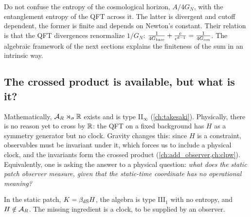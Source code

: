 \begin{whatwrong}
Do not confuse the entropy of the cosmological horizon, $A/4G_N$, with the entanglement entropy of the QFT across it. The latter is divergent and cutoff dependent, the former is finite and depends on Newton's constant. Their relation is that the QFT divergences renormalize $1/G_N$: $\frac{1}{4G_{\rm bare}}+\frac{c}{\epsilon^{d-1}}=\frac{1}{4G_{\rm ren}}$. The algebraic framework of the next sections explains the finiteness of the sum in an intrinsic way.
\end{whatwrong}

\subsection{The crossed product is available, but what is it?}

Mathematically, $\mathcal{A}_R\rtimes_\sigma\mathbb{R}$ exists and is type II$_\infty$ (\cref{ch:takesaki}). Physically, there is no reason yet to cross by $\mathbb{R}$: the QFT on a fixed background has $H$ as a symmetry generator but no clock. Gravity changes this: since $H$ is a constraint, observables must be invariant under it, which forces us to include a physical clock, and the invariants form the crossed product (\cref{ch:add_observer,ch:clpw}). Equivalently, one is asking the answer to a physical question: \emph{what does the static patch observer measure, given that the static-time coordinate has no operational meaning?}

\begin{keyidea}
In the static patch, $K=\beta_{\rm dS}H$, the algebra is type III$_1$ with no entropy, and $H\notin\mathcal{A}_R$. The missing ingredient is a clock, to be supplied by an observer.
\end{keyidea}

